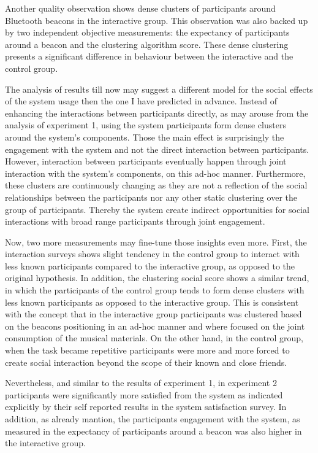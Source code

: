 \documentclass[a4paper,11pt]{article}
\begin{document}
{Another quality observation shows dense clusters of participants around Bluetooth beacons in the interactive group.
This observation was also backed up by two independent objective measurements: the expectancy of participants around a beacon and the clustering algorithm score.
These dense clustering presents a significant difference in behaviour between the interactive and the control group.

The analysis of results till now may suggest a different model for the social effects of the system usage then the one I have predicted in advance.
Instead of enhancing the interactions between participants directly, as may arouse from the analysis of experiment 1, using the system participants form dense clusters around the system's components.
Those the main effect is surprisingly the engagement with the system and not the direct interaction between participants.
However, interaction between participants eventually happen through joint interaction with the system's components, on this ad-hoc manner.
Furthermore, these clusters are continuously changing as they are not a reflection of the social relationships between the participants nor any other static clustering over the group of participants.
Thereby the system create indirect opportunities for social interactions with broad range participants through joint engagement.

Now, two more measurements may fine-tune those insights even more.
First, the interaction surveys shows slight tendency in the control group to interact with less known participants compared to the interactive group, as opposed to the original hypothesis.
In addition, the clustering social score shows a similar trend, in which the participants of the control group tends to form dense clusters with less known participants as opposed to the interactive group.
This is consistent with the concept that in the interactive group participants was clustered based on the beacons positioning in an ad-hoc manner and where focused on the joint consumption of the musical materials.
On the other hand, in the control group, when the task became repetitive participants were more and more forced to create social interaction beyond the scope of their known and close friends.

Nevertheless, and similar to the results of experiment 1, in experiment 2 participants were significantly more satisfied from the system as indicated explicitly by their self reported results in the system satisfaction survey.
In addition, as already mantion, the participants engagement with the system, as measured in the expectancy of participants around a beacon was also higher in the interactive group.

}
\end{document}
